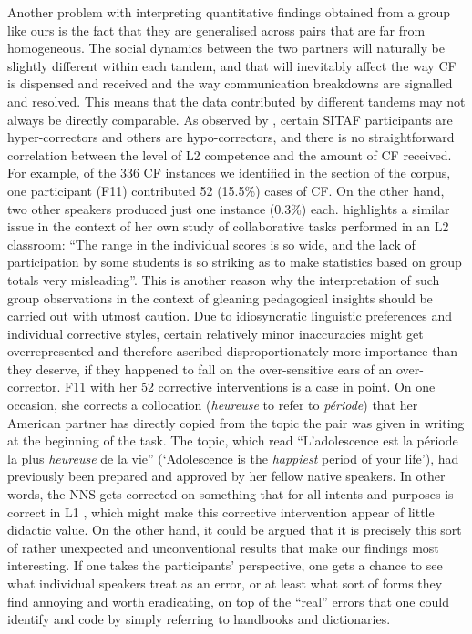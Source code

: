 \documentclass[output=paper,colorlinks,citecolor=brown,modfonts,nonflat]{../langscibook}
\begin{document}
Another problem with interpreting quantitative findings obtained from a group like ours is the fact that they are generalised across pairs that are far from homogeneous. The social dynamics between the two partners will naturally be slightly different within each tandem, and that will inevitably affect the way CF is dispensed and received and the way communication breakdowns are signalled and resolved. This means that the data contributed by different tandems may not always be directly comparable. As observed by \citet{HorguesTardieu2015}, certain SITAF participants are hyper-correctors and others are hypo-correctors, and there is no straightforward correlation between the level of L2 competence and the amount of CF received. For example, of the 336 CF instances we identified in the  section of the corpus, one participant (F11) contributed 52 (15.5\%) cases of CF. On the other hand, two other  speakers produced just one instance (0.3\%) each. \citet[25]{Foster1993} highlights a similar issue in the context of her own study of collaborative tasks performed in an L2 classroom: “The range in the individual scores is so wide, and the lack of participation by some students is so striking as to make statistics based on group totals very misleading”. This is another reason why the interpretation of such group observations in the context of gleaning pedagogical insights should be carried out with utmost caution. Due to idiosyncratic linguistic preferences and individual corrective styles, certain relatively minor inaccuracies might get overrepresented and therefore ascribed disproportionately more importance than they deserve, if they happened to fall on the over-sensitive ears of an over-corrector. F11 with her 52 corrective interventions is a case in point. On one occasion, she corrects a collocation (\textit{heureuse} to refer to \textit{période}) that her American partner has directly copied from the topic the pair was given in writing at the beginning of the task. The topic, which read “L’adolescence est la période la plus \textit{heureuse} de la vie” (‘Adolescence is the \textit{happiest} period of your life’), had previously been prepared and approved by her fellow native  speakers. In other words, the NNS gets corrected on something that for all intents and purposes is correct in L1 , which might make this corrective intervention appear of little didactic value. On the other hand, it could be argued that it is precisely this sort of rather unexpected and unconventional results that make our findings most interesting. If one takes the participants’ perspective, one gets a chance to see what individual speakers treat as an error, or at least what sort of forms they find annoying and worth eradicating, on top of the “real” errors that one could identify and code by simply referring to handbooks and dictionaries.
\end{document}
